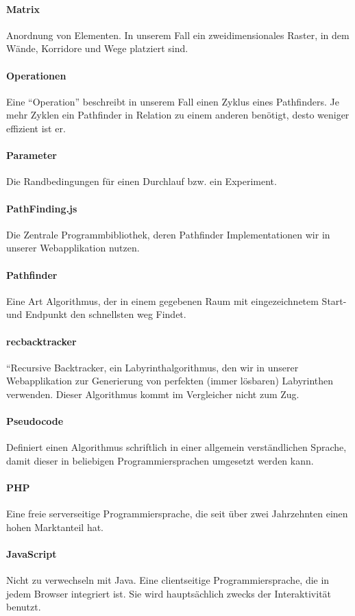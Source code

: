 \paragraph{Matrix} Anordnung von Elementen. In unserem Fall ein zweidimensionales Raster, in dem Wände, Korridore und Wege platziert sind.
\paragraph{Operationen} Eine ``Operation'' beschreibt in unserem Fall einen Zyklus eines Pathfinders. Je mehr Zyklen ein Pathfinder in Relation zu einem anderen benötigt, desto weniger effizient ist er.
\paragraph{Parameter} Die Randbedingungen für einen Durchlauf bzw. ein Experiment.
\paragraph{PathFinding.js} Die Zentrale Programmbibliothek, deren Pathfinder Implementationen wir in unserer Webapplikation nutzen.
\paragraph{Pathfinder} Eine Art Algorithmus, der in einem gegebenen Raum mit eingezeichnetem Start- und Endpunkt den schnellsten weg Findet.
\paragraph{recbacktracker} ``Recursive Backtracker, ein Labyrinthalgorithmus, den wir in unserer Webapplikation zur Generierung von perfekten (immer lösbaren) Labyrinthen verwenden. Dieser Algorithmus kommt im Vergleicher nicht zum Zug.
\paragraph{Pseudocode} Definiert einen Algorithmus schriftlich in einer allgemein verständlichen Sprache, damit dieser in beliebigen Programmiersprachen umgesetzt werden kann.
\paragraph{PHP} Eine freie serverseitige Programmiersprache, die seit über zwei Jahrzehnten einen hohen Marktanteil hat.
\paragraph{JavaScript} Nicht zu verwechseln mit Java. Eine clientseitige Programmiersprache, die in jedem Browser integriert ist. Sie wird hauptsächlich zwecks der Interaktivität benutzt. 
